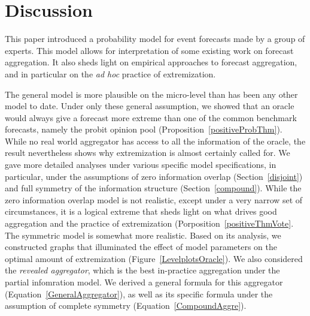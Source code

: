 \documentclass[11pt]{article}
\theoremstyle{definition}
\theoremstyle{definition}
\begin{document}
\clearpage

 
\section{Discussion}
\label{discussion}

This paper introduced a probability model for event forecasts made 
by a group of experts.  This model allows for interpretation
of some existing work on forecast aggregation.  It also sheds 
light on empirical approaches to forecast aggregation, and in 
particular on the {\em ad hoc} practice of extremization.  

The general model is more plausible on the micro-level than has
been any other model to date.  Under only these general assumption, 
we showed that an oracle would always give a forecast more extreme 
than one of the common benchmark forecasts, namely the probit
opinion pool (Proposition~\ref{positiveProbThm}).  While no 
real world aggregator has access to all the information of the 
oracle, the result nevertheless shows why extremization is almost 
certainly called for.  We gave more detailed analyses under various
specific model specifications, in particular, under the assumptions
of zero information overlap (Section~\ref{disjoint}) and full
symmetry of the information structure (Section~\ref{compound}).
While the zero information overlap model is not realistic, except
under a very narrow set of circumstances, it is a logical extreme
that sheds light on what drives good aggregation and the practice
of extremization (Porposition~\ref{positiveThmVote}.  The symmetric 
model is somewhat more realistic.  Based on its analysis, we 
constructed graphs that illuminated the effect of model parameters 
on the optimal amount of extremization (Figure~\ref{LevelplotsOracle}).
We also considered the {\em revealed aggregator}, which is the
best in-practice aggregation under the partial infomration model.
We derived a general formula for this aggregator 
(Equation~\ref{GeneralAggregator}), as well as its specific formula 
under the assumption of complete symmetry (Equation~\ref{CompoundAggre}).
\end{document}
